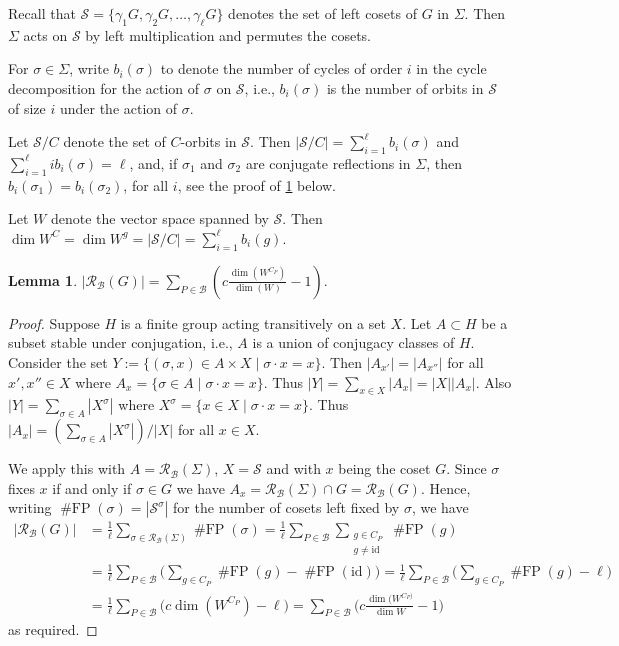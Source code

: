 \documentclass[12pt]{amsart}
\newtheorem{lem}[thm]{Lemma}
\theoremstyle{definition}
\newcommand{\id}{{\mathrm{id}}}
\newcommand{\calb}{\mathcal{B}}
\newcommand{\calr}{\mathcal{R}}
\newcommand{\cals}{\mathcal{S}}
\newcommand{\FP}{\operatorname{\#FP}}
\newcommand{\set}[1]{\{#1\}}
\begin{document}
Recall that $\cals = \set{\gamma_1G, \gamma_2 G, \dots, \gamma_\ell G}$ denotes the set of
left cosets of $G$ in $\Sigma$.   Then $\Sigma$ acts on $\cals$ by left multiplication and permutes the cosets. 


For $\sigma \in \Sigma$, write $b_i(\sigma)$ to denote the number of cycles of order $i$ 
in the cycle decomposition for the action of $\sigma$ on $\cals$, i.e., $b_i(\sigma)$ is the number of 
orbits in $\cals$ of size $i$ under the action of $\sigma$.  


Let $\cals/C$ denote the set of $C$-orbits in $\cals$.  Then $|\cals/C| = \sum_{i=1}^\ell b_i(\sigma)$ and $\sum_{i=1}^\ell i b_i(\sigma) = \ell$, and, if $\sigma_1$ and $\sigma_2$ are conjugate reflections in $\Sigma$, then $b_i(\sigma_1)=b_i(\sigma_2)$, for all $i$, see the proof of \ref{lem:counting hyps} below.

Let $W$ denote the vector space spanned by $\cals$.  Then $\dim W^C = \dim W^g = |\cals/C| = \sum_{i=1}^\ell b_i(g)$.

\begin{lem}\label{lem:counting hyps}
    $\displaystyle
    |\calr_\calb(G)| 
    = \sum_{P\in\calb}\left(c\frac{\dim (W^{C_P})}{\dim(W)} -1\right).
    $
\end{lem}
\begin{proof}
  Suppose $H$ is a finite group acting transitively on a set $X$.  Let $A \subset H$ be a subset stable under
  conjugation, i.e., $A$ is a union of conjugacy classes of $H$.   Consider the set 
  $Y := \{(\sigma,x) \in  A \times X \mid \sigma \cdot x = x\}$.
  Then $|A_{x'}| = |A_{x''}|$ for all $x',x'' \in X$ where 
  $A_x = \{\sigma \in A \mid \sigma \cdot x = x\}$.  
  Thus $|Y| = \sum_{x \in X} |A_x| = |X| |A_{x}|$.   Also
  $|Y| = \sum_{\sigma \in A} |X^\sigma|$ where $X^\sigma = \{x \in X \mid \sigma\cdot x = x\}$.
  Thus $|A_{x}|= (\sum_{\sigma \in A} |X^\sigma|)/|X|$ for all $x \in X$.
  
    We apply this with $A = \calr_\calb(\Sigma)$, $X=\cals$ and with $x$ being the coset $G$.  
    Since $\sigma$ fixes $x$ if and only if $\sigma \in G$ we have
    $A_{x} = \calr_\calb(\Sigma) \cap G = \calr_\calb(G)$.  Hence, writing  $\FP(\sigma)=|\cals^\sigma|$ for the number of cosets left fixed by $\sigma$,
    we have 
\begin{align*}
    |\calr_\calb(G)|  &= \frac{1}{\ell}\sum_{\sigma \in \calr_\calb(\Sigma)}\FP(\sigma) =
           \frac{1}{\ell}\sum_{P\in\calb} \sum_{\substack{{g\in C_P}\\ {g \ne \id}}}\FP(g)\\
            &= \frac{1}{\ell}\sum_{P\in\calb} \big(\sum_{g \in C_P} \FP(g) - \FP(\id)\big)
            = \frac{1}{\ell}\sum_{P\in\calb}  \big(\sum_{g \in C_P} \FP(g) - \ell \big)\\
            &= \frac{1}{\ell}\sum_{P\in\calb} \big(c \dim(W^{C_P}) - \ell\big)
            = \sum_{P\in\calb} \big(c\frac{\dim(W^{C_P)}}{\dim W} - 1\big)
\end{align*}
as required.
\end{proof}
\end{document}
